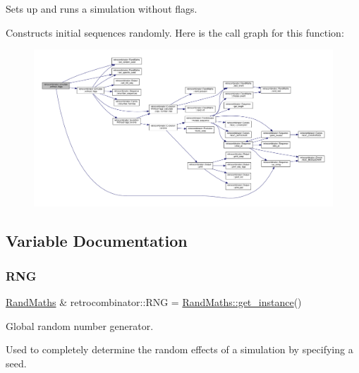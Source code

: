 Sets up and runs a simulation without flags. 

Constructs initial sequences randomly. Here is the call graph for this function\+:
\nopagebreak
\begin{figure}[H]
\begin{center}
\leavevmode
\includegraphics[width=350pt]{namespaceretrocombinator_a0dc31e2b9d6473e995395d8171f56312_cgraph}
\end{center}
\end{figure}


\subsection{Variable Documentation}
\mbox{\label{namespaceretrocombinator_a4987db6a228df9ffab41c0a5342556f6}} 
\subsubsection{\texorpdfstring{R\+NG}{RNG}}
{\footnotesize\ttfamily \hyperlink{classretrocombinator_1_1RandMaths}{Rand\+Maths} \& retrocombinator\+::\+R\+NG = \hyperlink{classretrocombinator_1_1RandMaths_ae54dee1a16fb0e275e1624ccaa7dc87e}{Rand\+Maths\+::get\+\_\+instance}()}



Global random number generator. 

Used to completely determine the random effects of a simulation by specifying a seed. 